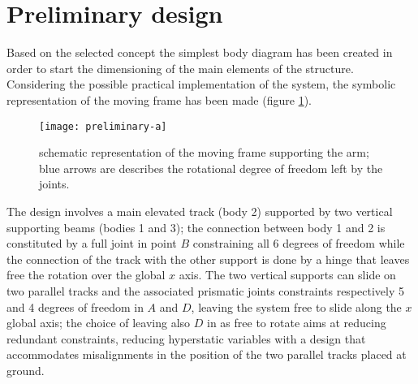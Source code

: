\section{Preliminary design}
	Based on the selected concept the simplest body diagram has been created in order to start the dimensioning of the main elements of the structure. Considering the possible practical implementation of the system, the symbolic representation of the moving frame has been made (figure \ref{fig:freebodydiagramframe}).
	
	\begin{figure}[bht]
		\centering \texttt{[image: preliminary-a]}
		\caption{schematic representation of the moving frame supporting the arm; blue arrows are describes the rotational degree of freedom left by the joints.}
		\label{fig:freebodydiagramframe}
	\end{figure}
	
	The design involves a main elevated track (body 2) supported by two vertical supporting beams (bodies 1 and 3); the connection between body 1 and 2 is constituted by a full joint in point $B$ constraining all 6 degrees of freedom while the connection of the track with the other support is done by a hinge that leaves free the rotation over the global $x$ axis. The two vertical supports can slide on two parallel tracks and the associated prismatic joints constraints respectively 5 and 4 degrees of freedom in $A$ and $D$, leaving the system free to slide along the $x$ global axis; the choice of leaving also $D$ in as free to rotate aims at reducing redundant constraints, reducing hyperstatic variables with a design that accommodates misalignments in the position of the two parallel tracks placed at ground.
	
